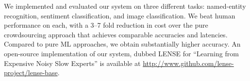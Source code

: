 We implemented and evaluated our system on three different tasks: named-entity
recognition, sentiment classification, and image classification.
We beat human performance on each, 
with a 3--7 fold reduction in cost over the pure crowdsourcing approach 
that achieves comparable accuracies and latencies.
Compared to pure ML approaches, we obtain substantially higher accuracy.
An open-source implementation of our system, dubbed LENSE for ``Learning from Expensive Noisy Slow Experts'' is available at
\href{http://www.github.com/lense-project/lense-base}{http://www.github.com/lense-project/lense-base}.


% 
